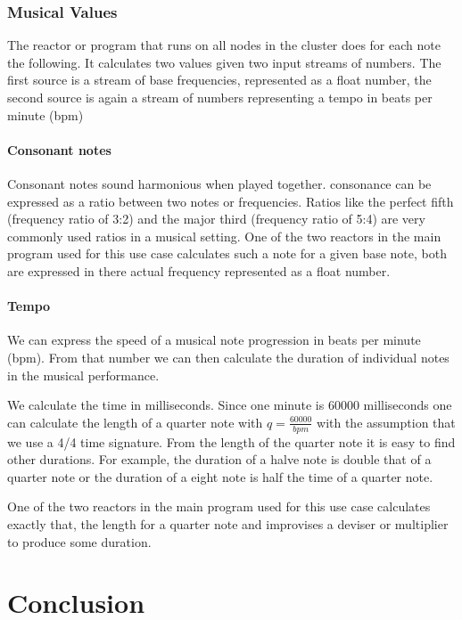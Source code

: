 \documentclass[a4paper]{book}
\begin{document}
\subsection{Musical Values}
The reactor or program that runs on all nodes in the cluster does for each note the following. It calculates two values given two input streams of numbers. The first source is a stream of base frequencies, represented as a float number, the second source is again a stream of numbers representing a tempo in beats per minute (bpm)

\subsubsection*{Consonant notes}
Consonant notes sound harmonious when played together. consonance can be expressed as a ratio between two notes or frequencies. Ratios like the perfect fifth (frequency ratio of 3:2) and the major third (frequency ratio of 5:4) are very commonly used ratios in a musical setting. One of the two reactors in the main program used for this use case calculates such a note for a given base note, both are expressed in there actual frequency represented as a float number.

\subsubsection*{Tempo}
We can express the speed of a musical note progression in beats per minute (bpm). From that number we can then calculate the duration of individual notes in the musical performance. 

We calculate the time in milliseconds. Since one minute is 60000 milliseconds one can calculate the length of a quarter note with \(q = \frac{60000}{bpm}\) with the assumption that we use a 4/4 time signature. From the length of the quarter note it is easy to find other durations. For example, the duration of a halve note is double that of a quarter note or the duration of a eight note is half the time of a quarter note.

One of the two reactors in the main program used for this use case calculates exactly that, the length for a quarter note and improvises a deviser or multiplier to produce some duration. 

\chapter{Conclusion}
\end{document}
